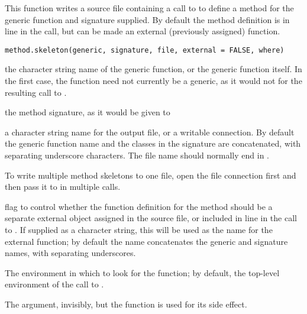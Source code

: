 %
\begin{Description}\relax
This function writes a source file containing a call to
 to define a method for the generic function
and signature supplied.  By default the method definition is in line
in the call, but can be made an external (previously assigned) function.
\end{Description}
%
\begin{Usage}
\begin{verbatim}
method.skeleton(generic, signature, file, external = FALSE, where)
\end{verbatim}
\end{Usage}
%
\begin{Arguments}
\begin{ldescription}
\item[\code{generic}] the character string name of the generic function, or
the generic function itself.  In the first case, the function
need not currently be a generic, as it would not for the
resulting call to .
\item[\code{signature}] the method signature, as it would be given to 
\item[\code{file}] a character string name for the output file, or a
writable connection.  By default the generic function name and
the classes in the signature are concatenated, with separating
underscore characters.  The file name should normally end in . 

To write multiple method skeletons to one file, open the file
connection first and then pass it to  in
multiple calls.
\item[\code{external}] flag to control whether the function definition for
the method should be a separate external object assigned in the
source file, or included in line in the call to
.
If supplied as a character string, this will be used as the name
for the external function; by default the name concatenates the
generic and signature names, with separating underscores.
\item[\code{where}] The environment in which to look for the function; by default,
the top-level environment of the call to .
\end{ldescription}
\end{Arguments}
%
\begin{Value}
The  argument, invisibly, but the function is used for its side effect.
\end{Value}
